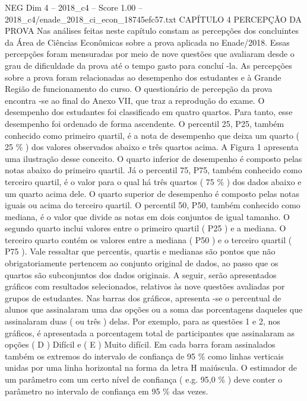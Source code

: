 \begin{textsample}{NEG Dim 4 – 2018\_c4 – Score 1.00 – 2018\_c4/enade\_2018\_ci\_econ\_18745efc57.txt}  \label{ex:f4_neg_171}
CAPÍTULO 4 PERCEPÇÃO DA PROVA Nas análises feitas neste capítulo constam as percepções dos concluintes da Área de Ciências Econômicas sobre a prova aplicada no Enade/2018.
Essas percepções foram mensuradas por meio de nove questões que avaliaram desde o grau de dificuldade da prova até o tempo gasto para concluí -la.
As percepções sobre a prova foram relacionadas ao desempenho dos estudantes e à Grande Região de funcionamento do curso.
O questionário de percepção da prova encontra -se ao final do Anexo VII, que traz a reprodução do exame.
O desempenho dos estudantes foi classificado em quatro quartos.
Para tanto, esse desempenho foi ordenado de forma ascendente.
O percentil 25, P25, também conhecido como primeiro quartil, é a nota de desempenho que deixa um quarto ( 25 \% ) dos valores observados abaixo e três quartos acima.
A Figura 1 apresenta uma ilustração desse conceito.
O quarto inferior de desempenho é composto pelas notas abaixo do primeiro quartil.
Já o percentil 75, P75, também conhecido como terceiro quartil, é o valor para o qual há três quartos ( 75 \% ) dos dados abaixo e um quarto acima dele.
O quarto superior de desempenho é composto pelas notas iguais ou acima do terceiro quartil.
O percentil 50, P50, também conhecido como mediana, é o valor que divide as notas em dois conjuntos de igual tamanho.
O segundo quarto inclui valores entre o primeiro quartil ( P25 ) e a mediana.
O terceiro quarto contém os valores entre a mediana ( P50 ) e o terceiro quartil ( P75 ).
Vale ressaltar que percentis, quartis e medianas são pontos que não obrigatoriamente pertencem ao conjunto original de dados, ao passo que os quartos são subconjuntos dos dados originais.
A seguir, serão apresentados gráficos com resultados selecionados, relativos às nove questões avaliadas por grupos de estudantes.
Nas barras dos gráficos, apresenta -se o percentual de alunos que assinalaram uma das opções ou a soma das porcentagens daqueles que assinalaram duas ( ou três ) delas.
Por exemplo, para as questões 1 e 2, nos gráficos, é apresentada a porcentagem total de participantes que assinalaram as opções ( D ) Difícil e ( E ) Muito difícil.
Em cada barra foram assinalados também os extremos do intervalo de confiança de 95 \% como linhas verticais unidas por uma linha horizontal na forma da letra H maiúscula.
O estimador de um parâmetro com um certo nível de confiança ( e.g. 95,0 \% ) deve conter o parâmetro no intervalo de confiança em 95 \% das vezes.

\end{textsample}
